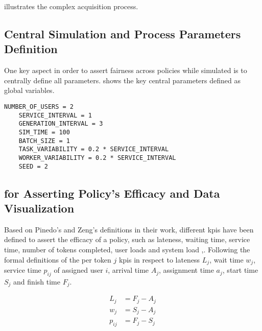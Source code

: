 \documentclass{seal_thesis}
\begin{document}

 illustrates the complex acquisition process.


\subsection{Central Simulation and Process Parameters Definition}

One key aspect in order to assert fairness across policies while simulated is to centrally define all parameters.  shows the key central parameters defined as global variables.

\begin{lstlisting}[caption=Central parameters definition that ensures fairness across simulation runs,label=lst:central_parameters,style=CustomPython]
	NUMBER_OF_USERS = 2
	SERVICE_INTERVAL = 1
	GENERATION_INTERVAL = 3
	SIM_TIME = 100
	BATCH_SIZE = 1
	TASK_VARIABILITY = 0.2 * SERVICE_INTERVAL
	WORKER_VARIABILITY = 0.2 * SERVICE_INTERVAL
	SEED = 2
\end{lstlisting}

\subsection{ for Asserting Policy's Efficacy and Data Visualization}

Based on Pinedo's and Zeng's definitions in their work, different \glspl{kpi} have been defined to assert the efficacy of a policy, such as lateness, waiting time, service time, number of tokens completed, user loads and system load \cite{Pinedo2008},\cite{Zeng2005}. Following the formal definitions of the per token $j$ \glspl{kpi} in respect to lateness $L_j$, wait time $w_j$, service time $p_{ij}$ of assigned user $i$, arrival time $A_j$, assignment time $a_j$, start time $S_j$ and finish time $F_j$.

\begin{align}
	L_j&=F_j-A_j \label{eq:lateness}\\
	w_j&=S_j-A_j \\
	p_{ij}&=F_j-S_j
\end{align}
\end{document}
